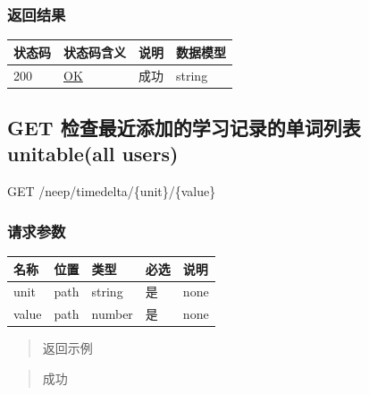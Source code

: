 \documentclass[
]{article}
\begin{document}
\hypertarget{ux8fd4ux56deux7ed3ux679c-15}{%
\subsubsection{返回结果}\label{ux8fd4ux56deux7ed3ux679c-15}}

\begin{longtable}[]{@{}llll@{}}
\toprule
状态码 & 状态码含义 & 说明 & 数据模型 \\
\midrule
\endhead
200 & \href{https://tools.ietf.org/html/rfc7231\#section-6.3.1}{OK} &
成功 & string \\
\bottomrule
\end{longtable}

\hypertarget{get-ux68c0ux67e5ux6700ux8fd1ux6dfbux52a0ux7684ux5b66ux4e60ux8bb0ux5f55ux7684ux5355ux8bcdux5217ux8868unitableall-users}{%
\subsection{GET 检查最近添加的学习记录的单词列表unitable(all
users)}\label{get-ux68c0ux67e5ux6700ux8fd1ux6dfbux52a0ux7684ux5b66ux4e60ux8bb0ux5f55ux7684ux5355ux8bcdux5217ux8868unitableall-users}}

GET /neep/timedelta/\{unit\}/\{value\}

\hypertarget{ux8bf7ux6c42ux53c2ux6570-16}{%
\subsubsection{请求参数}\label{ux8bf7ux6c42ux53c2ux6570-16}}

\begin{longtable}[]{@{}lllll@{}}
\toprule
名称 & 位置 & 类型 & 必选 & 说明 \\
\midrule
\endhead
unit & path & string & 是 & none \\
value & path & number & 是 & none \\
\bottomrule
\end{longtable}

\begin{quote}
返回示例
\end{quote}

\begin{quote}
成功
\end{quote}
\end{document}
